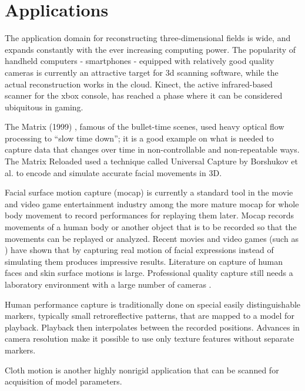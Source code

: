 \section{Applications}

The application domain for reconstructing three-dimensional fields is wide, and expands constantly with the ever increasing computing power.
The popularity of handheld computers - smartphones - equipped with relatively good quality cameras is currently an attractive target for 3d scanning software, while the actual reconstruction works in the cloud.
Kinect, the active infrared-based scanner for the xbox console, has reached a phase where it can be considered ubiquitous in gaming.

The Matrix (1999) \cite{wachowski99matrix}, famous of the bullet-time scenes, used heavy optical flow processing to ``slow time down''; it is a good example on what is needed to capture data that changes over time in non-controllable and non-repeatable ways.
The Matrix Reloaded \cite{wachowski03reloaded} used a technique called Universal Capture by Borshukov et al.
\cite{borshukov05universal} to encode and simulate accurate facial movements in 3D.

Facial surface motion capture (mocap) is currently a standard tool in the movie and video game entertainment industry among the more mature mocap for whole body movement to record performances for replaying them later.
Mocap records movements of a human body or another object that is to be recorded so that the movements can be replayed or analyzed.
Recent movies and video games (such as \cite{rockstar2011noire}) have shown that by capturing real motion of facial expressions instead of simulating them produces impressive results.
Literature on capture of human faces and skin surface motions is large. \cite{deng2007computer}
Professional quality capture still needs a laboratory environment with a large number of cameras \cite{winder2008technical,motionscan}.

Human performance capture is traditionally done on special easily distinguishable markers, typically small retroreflective patterns, that are mapped to a model for playback. Playback then interpolates between the recorded positions. Advances in camera resolution make it possible to use only texture features without separate markers.

Cloth motion is another highly nonrigid application that can be scanned for acquisition of model parameters. \cite{pritchard2003cloth}


